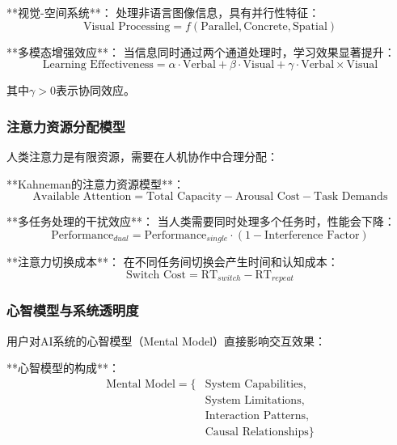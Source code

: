 **视觉-空间系统**：
处理非语言图像信息，具有并行性特征：
\begin{equation}
\text{Visual Processing} = f(\text{Parallel}, \text{Concrete}, \text{Spatial})
\end{equation}

**多模态增强效应**：
当信息同时通过两个通道处理时，学习效果显著提升：
\begin{equation}
\text{Learning Effectiveness} = \alpha \cdot \text{Verbal} + \beta \cdot \text{Visual} + \gamma \cdot \text{Verbal} \times \text{Visual}
\end{equation}

其中$\gamma > 0$表示协同效应。

\subsubsection{注意力资源分配模型} %

人类注意力是有限资源，需要在人机协作中合理分配：

**Kahneman的注意力资源模型**：
\begin{equation}
\text{Available Attention} = \text{Total Capacity} - \text{Arousal Cost} - \text{Task Demands}
\end{equation}

**多任务处理的干扰效应**：
当人类需要同时处理多个任务时，性能会下降：
\begin{equation}
\text{Performance}_{dual} = \text{Performance}_{single} \cdot (1 - \text{Interference Factor})
\end{equation}

**注意力切换成本**：
在不同任务间切换会产生时间和认知成本：
\begin{equation}
\text{Switch Cost} = \text{RT}_{switch} - \text{RT}_{repeat}
\end{equation}

\subsubsection{心智模型与系统透明度} %

用户对AI系统的心智模型（Mental Model）直接影响交互效果：

**心智模型的构成**：
\begin{align}
\text{Mental Model} = \{&\text{System Capabilities}, \\
&\text{System Limitations}, \\
&\text{Interaction Patterns}, \\
&\text{Causal Relationships}\}
\end{align}

